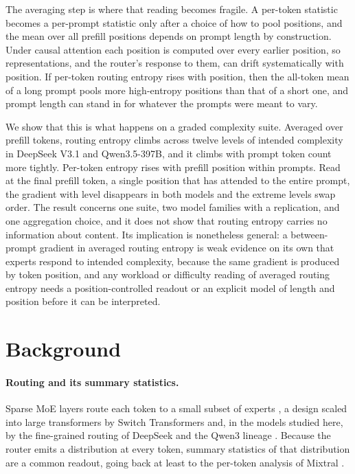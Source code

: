 \documentclass[10pt,twocolumn]{article}
\begin{document}
The averaging step is where that reading becomes fragile. A per-token
statistic becomes a per-prompt statistic only after a choice of how to pool
positions, and the mean over all prefill positions depends on prompt length
by construction. Under causal attention each position is computed
over every earlier position, so representations, and the router's response
to them, can drift systematically with position. If per-token routing
entropy rises with position, then the all-token mean of a long prompt pools
more high-entropy positions than that of a short one, and prompt length can
stand in for whatever the prompts were meant to vary.

We show that this is what happens on a graded complexity suite. Averaged
over prefill tokens, routing entropy climbs across twelve levels of intended
complexity in DeepSeek V3.1 and Qwen3.5-397B, and it climbs with prompt
token count more tightly. Per-token entropy rises with prefill position
within prompts. Read at the final prefill token, a single position that has
attended to the entire prompt, the gradient with level disappears in both
models and the extreme levels swap order. The result concerns one suite, two
model families with a replication, and one aggregation choice, and it does
not show that routing entropy carries no information about content. Its
implication is nonetheless general: a between-prompt gradient in averaged
routing entropy is weak evidence on its own that experts respond to intended
complexity, because the same gradient is produced by token position, and any
workload or difficulty reading of averaged routing entropy needs a
position-controlled readout or an explicit model of length and position
before it can be interpreted.

\section{Background}
\label{sec:related}

\paragraph{Routing and its summary statistics.}
Sparse MoE layers route each token to a small subset of experts
\citep{jacobs1991adaptive,shazeer2017outrageously}, a design scaled into
large transformers by Switch Transformers \citep{fedus2022switch} and, in the
models studied here, by the fine-grained routing of DeepSeek
\citep{dai2024deepseekmoe,deepseekai2024v3,deepseekai2025r1} and the Qwen3
lineage \citep{yang2025qwen3}. Because the router emits a distribution at
every token, summary statistics of that distribution are a common readout,
going back at least to the per-token analysis of Mixtral
\citep{jiang2024mixtral}.
\end{document}
